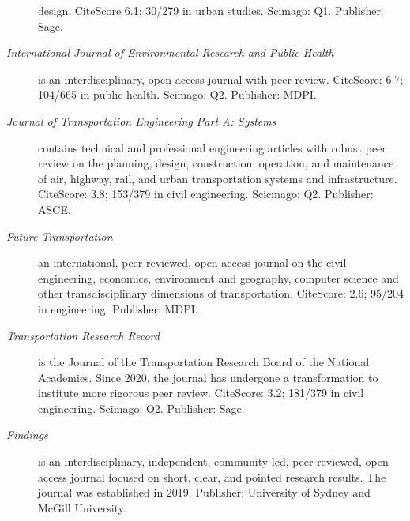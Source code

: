 \documentclass[margin,line]{res}
\begin{document}
\begin{resume}
\begin{description}
  design. CiteScore 6.1; 30/279 in urban studies. Scimago: Q1. Publisher: Sage.
  \item[\textit{International Journal of Environmental Research and Public Health}]
  is an interdisciplinary, open access journal with peer review. CiteScore: 6.7;
  104/665 in public health. Scimago: Q2. Publisher: MDPI.
  \item[\textit{Journal of Transportation Engineering Part A: Systems}] contains
  technical and professional engineering articles with robust peer review on the
  planning, design, construction, operation, and maintenance of air, highway,
  rail, and urban transportation systems and infrastructure.  CiteScore: 3.8; 153/379 in civil engineering. Scicmago: Q2. Publisher: ASCE.
  \item[\textit{Future Transportation}] an international, peer-reviewed, open
  access journal on the civil engineering, economics, environment and geography,
  computer science and other transdisciplinary dimensions of transportation. 
  CiteScore: 2.6; 95/204 in engineering. Publisher: MDPI.
  \item[\textit{Transportation Research Record}] is the Journal of the
  Transportation Research Board of the National Academies. Since 2020, the 
  journal has undergone a transformation to institute more rigorous peer review.
  CiteScore: 3.2; 181/379 in civil engineering. Scimago: Q2. Publisher: Sage.
  \item[\textit{Findings}] is an interdisciplinary, independent, community-led,
  peer-reviewed, open access journal focused on short, clear, and pointed
  research results. The journal was established in 2019. Publisher: University of
  Sydney and McGill University.
\end{description}
\fi


\noindent\makebox[\linewidth]{\rule{\linewidth}{0.4pt}}

\end{resume}
\end{document}
